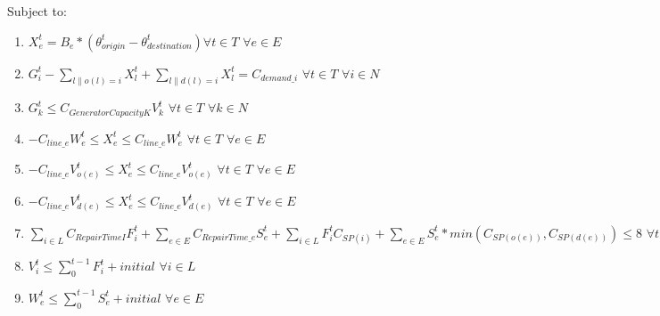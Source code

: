 \documentclass{article}
\begin{document}
	Subject to:
	\begin{enumerate}[label=(\arabic*), leftmargin=*, itemsep=0.4ex, before={\everymath{\displaystyle}}]%
		
		\item $ X_e^t = B_e * (\theta_{origin}^t - \theta_{destination}^t) \forall t \in T \hspace{4pt} \forall e \in E$
		\item $ G_i^t - \sum_{l\|o(l)=i} X_l^t + \sum_{l\|d(l)=i} X_l^t = C_{demand\_i} \hspace{4pt} \forall t \in T \hspace{4pt} \forall i \in N$
		\item $G_k^t \leq C_{GeneratorCapacityK} V_{k}^t \hspace{4pt} \forall t\in T \hspace{4pt} \forall k \in N$
		\item $-C_{line\_e}W_{e}^t \leq X_{e}^t \leq C_{line\_e}W_{e}^t \hspace{4pt} \forall t \in T \hspace{4pt} \forall e \in E$
		\item $-C_{line\_e}V_{o(e)}^t \leq X_{e}^t \leq C_{line\_e}V_{o(e)}^t \hspace{4pt} \forall t \in T \hspace{4pt} \forall e \in E$
		\item $-C_{line\_e}V_{d(e)}^t \leq X_{e}^t \leq C_{line\_e}V_{d(e)}^t \hspace{4pt} \forall t \in T \hspace{4pt} \forall e \in E$
		
		\item $\sum_{i \in L} C_{RepairTimeI} F_{i}^t +\sum_{e \in E} C_{RepairTime\_e} S_{e}^t + \sum_{i \in L} F_i^t C_{SP(i)} + \sum_{e \in E} S_{e}^t * min(C_{SP(o(e))},C_{SP(d(e))}) \leq 8 \hspace{4pt} \forall t \in T \hspace{4pt}$
		\item $V_i^t \leq \sum_{0}^{t-1} F_i^t+initial \hspace{4pt} \forall i \in L$ 
		\item $W_{e}^t \leq \sum_{0}^{t-1} S_{e}^t+initial \hspace{4pt} \forall e \in E $
		\end{enumerate}
\end{document}
